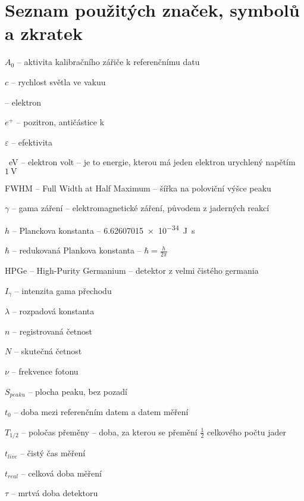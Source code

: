 
\section*{Seznam použitých značek, symbolů a zkratek}
\begin{spacing}{1.2}
	\begin{list}{}{}
		\item $A_0$ -- aktivita kalibračního zářiče k referenčnímu datu
		\item $c$ -- rychlost světla ve vakuu %
		\item \e -- elektron%
		\item $e^+$ -- pozitron, antičástice k \e	
		\item $\varepsilon$ -- efektivita
		\item \SI{}{\electronvolt} -- elektron volt -- je to energie, kterou má jeden elektron urychlený napětím $\SI{1}{\volt}$
		\item FWHM -- Full Width at Half Maximum -- šířka na poloviční výšce peaku
		\item $\gamma$ -- gama záření -- elektromagnetické záření, původem z jaderných reakcí
		\item $h$ -- Planckova konstanta -- \SI{6.62607015e-34}{\joule\second} 
		\item $\hbar$ -- redukovaná Plankova konstanta -- $\hbar = \frac{h}{2\pi}$
		\item HPGe -- High-Purity Germanium -- detektor z velmi čistého germania
		\item $I_\gamma$ -- intenzita gama přechodu
		\item $\lambda$ -- rozpadová konstanta %
		\item $n$ -- registrovaná četnost
		\item $N$ -- skutečná četnost
		\item $\nu$ -- frekvence fotonu
		\item $S_{peaku}$ -- plocha peaku, bez pozadí
		\item $t_0$ -- doba mezi referenčním datem a datem měření
		\item $T_{1/2}$ -- poločas přeměny -- doba, za kterou se přemění $\frac{1}{2}$ celkového počtu jader
		\item $t_{live}$ -- čistý čas měření
		\item $t_{real}$ -- celková doba měření
		\item $\tau$ -- mrtvá doba detektoru	
	\end{list}
\end{spacing}
\newpage
{}
